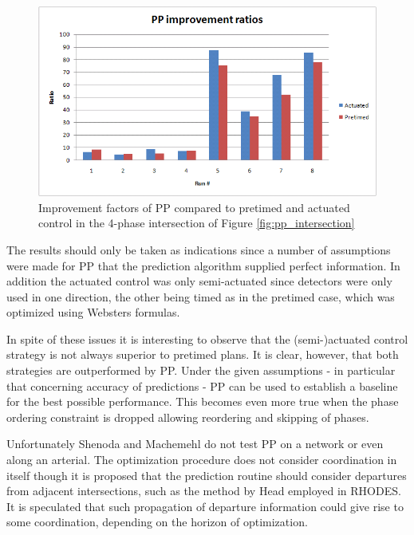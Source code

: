 \begin{figure}[!ht]
\begin{center}
\includegraphics[scale=0.35]{phase-by-phase_improvement_ratios.png} 
\end{center}
\caption{Improvement factors of PP compared to pretimed and actuated control in the 4-phase intersection of Figure \ref{fig:pp_intersection}}
\label{fig:pp_improvements}
\end{figure}

The results should only be taken as indications since a number of
assumptions were made for PP that the prediction algorithm supplied
perfect information. In addition the actuated control was only
semi-actuated since detectors were only used in one direction, the
other being timed as in the pretimed case, which was optimized using
Websters formulas.

In spite of these issues it is interesting to observe that the
(semi-)actuated control strategy is not always superior to pretimed
plans. It is clear, however, that both strategies are outperformed by
PP. Under the given assumptions - in particular that concerning
accuracy of predictions - PP can be used to establish a baseline for
the best possible performance. This becomes even more true when the
phase ordering constraint is dropped allowing reordering and skipping
of phases.

Unfortunately Shenoda and Machemehl do not test PP on a network or
even along an arterial. The optimization procedure does not consider
coordination in itself though it is proposed that the prediction
routine should consider departures from adjacent intersections, such
as the method by Head employed in RHODES. It is speculated that such
propagation of departure information could give rise to some
coordination, depending on the horizon of optimization.
